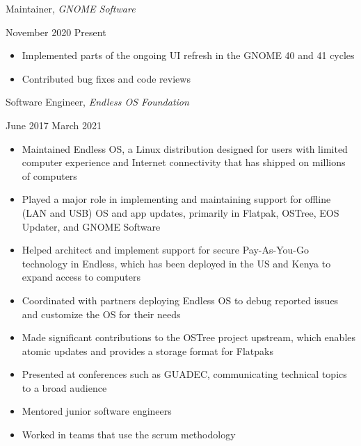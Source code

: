 \documentclass[11pt]{article}
\begin{document}
\begin{minipage}[t]{0.65\textwidth}
\flushleft
Maintainer, \textit{GNOME Software}\\
\end{minipage}
\begin{minipage}[t]{0.30\textwidth}
\flushright
November 2020 \space \textemdash \space Present\\
\end{minipage}

\begin{itemize}
  \item Implemented parts of the ongoing UI refresh in the GNOME 40 and 41 cycles
  \item Contributed bug fixes and code reviews
\end{itemize}

\begin{minipage}[t]{0.65\textwidth}
\flushleft
Software Engineer, \textit{Endless OS Foundation}\\
\end{minipage}
\begin{minipage}[t]{0.30\textwidth}
\flushright
June 2017 \space \textemdash \space March 2021\\
\end{minipage}

\begin{itemize}
  \item Maintained Endless OS, a Linux distribution designed for users with limited computer experience and Internet connectivity that has shipped on millions of computers
  \item Played a major role in implementing and maintaining support for offline (LAN and USB) OS and app updates, primarily in Flatpak, OSTree, EOS Updater, and GNOME Software
  \item Helped architect and implement support for secure Pay-As-You-Go technology in Endless, which has been deployed in the US and Kenya to expand access to computers
  \item Coordinated with partners deploying Endless OS to debug reported issues and customize the OS for their needs
  \item Made significant contributions to the OSTree project upstream, which enables atomic updates and \mbox{provides} a storage format for Flatpaks
  \item Presented at conferences such as GUADEC, communicating technical topics to a broad audience
  \item Mentored junior software engineers
  \item Worked in teams that use the scrum methodology
\end{itemize}
\end{document}
